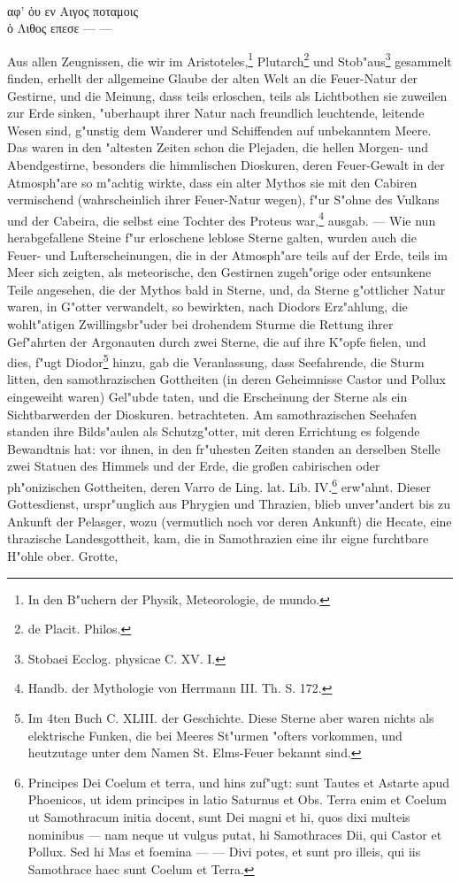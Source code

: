 \documentclass[a4paper, 11pt, oneside, polutonikogreek, german]{article}
\begin{document}
\vspace{1pt}
\\
αφ' ὁυ εν Αιγος ποταμοις\\
ὁ Λιθος επεσε --- ---\\
\vspace{1pt}

Aus allen Zeugnissen, die wir im Aristoteles,\footnote{In den B"uchern der Physik, Meteorologie, de mundo.} Plutarch\footnote{de Placit. Philos.} und Stob"aus\footnote{Stobaei Ecclog. physicae C. XV. I.} gesammelt finden, erhellt der allgemeine Glaube der alten Welt an die Feuer-Natur der Gestirne, und die Meinung, dass teils erloschen, teils als Lichtbothen sie zuweilen zur Erde sinken, "uberhaupt ihrer Natur nach freundlich leuchtende, leitende Wesen sind, g"unstig dem Wanderer und Schiffenden auf unbekanntem Meere. Das waren in den "altesten Zeiten schon die Plejaden, die hellen Morgen- und Abendgestirne, besonders die himmlischen Dioskuren, deren Feuer-Gewalt in der Atmosph"are so m"achtig wirkte, dass ein alter Mythos sie mit den Cabiren vermischend (wahrscheinlich ihrer Feuer-Natur wegen), f"ur S"ohne des Vulkans und der Cabeira, die selbst eine Tochter des Proteus war,\footnote{Handb. der Mythologie von Herrmann III. Th. S. 172.} ausgab. --- Wie nun herabgefallene Steine f"ur erloschene leblose Sterne galten, wurden auch die Feuer- und Lufterscheinungen, die in der Atmosph"are teils auf der Erde, teils im Meer sich zeigten, als meteorische, den Gestirnen zugeh"orige oder entsunkene Teile angesehen, die der Mythos bald in Sterne, und, da Sterne g"ottlicher Natur waren, in G"otter verwandelt, so bewirkten, nach Diodors Erz"ahlung, die wohlt"atigen Zwillingsbr"uder bei drohendem Sturme die Rettung ihrer Gef"ahrten der Argonauten durch zwei Sterne, die auf ihre K"opfe fielen, und dies, f"ugt Diodor\footnote{Im 4ten Buch C. XLIII. der Geschichte. Diese Sterne aber waren nichts als elektrische Funken, die bei Meeres St"urmen "ofters vorkommen, und heutzutage unter dem Namen St. Elms-Feuer bekannt sind.} hinzu, gab die Veranlassung, dass Seefahrende, die Sturm litten, den samothrazischen Gottheiten (in deren Geheimnisse Castor und Pollux eingeweiht waren) Gel"ubde taten, und die Erscheinung der Sterne als ein Sichtbarwerden der Dioskuren. betrachteten. Am samothrazischen Seehafen standen ihre Bilds"aulen als Schutzg"otter, mit deren Errichtung es folgende Bewandtnis hat: vor ihnen, in den fr"uhesten Zeiten standen an derselben Stelle zwei Statuen des Himmels und der Erde, die großen cabirischen oder ph"onizischen Gottheiten, deren Varro de Ling. lat. Lib. IV.\footnote{Principes Dei Coelum et terra, und hins zuf"ugt: sunt Tautes et Astarte apud Phoenicos, ut idem principes in latio Saturnus et Obs. Terra enim et Coelum ut Samothracum initia docent, sunt Dei magni et hi, quos dixi multeis nominibus --- nam neque ut vulgus putat, hi Samothraces Dii, qui Castor et Pollux. Sed hi Mas et foemina --- --- Divi potes, et sunt pro illeis, qui iis Samothrace haec sunt Coelum et Terra.} erw"ahnt. Dieser Gottesdienst, urspr"unglich aus Phrygien und Thrazien, blieb unver"andert bis zu Ankunft der Pelasger, wozu (vermutlich noch vor deren Ankunft) die Hecate, eine thrazische Landesgottheit, kam, die in Samothrazien eine ihr eigne furchtbare H"ohle ober. Grotte, 
\end{document}
